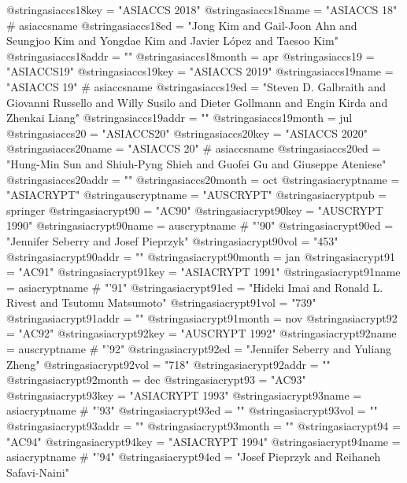 @string{asiaccs18key =          "ASIACCS 2018"}
@string{asiaccs18name =         "ASIACCS 18" # asiaccsname}
@string{asiaccs18ed =           "Jong Kim and Gail-Joon Ahn and Seungjoo Kim and Yongdae Kim and Javier L{\'o}pez and Taesoo Kim"}
@string{asiaccs18addr =         ""}
@string{asiaccs18month =        apr}
@string{asiaccs19 =             "ASIACCS19"}
@string{asiaccs19key =          "ASIACCS 2019"}
@string{asiaccs19name =         "ASIACCS 19" # asiaccsname}
@string{asiaccs19ed =           "Steven D. Galbraith and Giovanni Russello and Willy Susilo and Dieter Gollmann and Engin Kirda and Zhenkai Liang"}
@string{asiaccs19addr =         ""}
@string{asiaccs19month =        jul}
@string{asiaccs20 =             "ASIACCS20"}
@string{asiaccs20key =          "ASIACCS 2020"}
@string{asiaccs20name =         "ASIACCS 20" # asiaccsname}
@string{asiaccs20ed =           "Hung-Min Sun and Shiuh-Pyng Shieh and Guofei Gu and Giuseppe Ateniese"}
@string{asiaccs20addr =         ""}
@string{asiaccs20month =        oct}
@string{asiacryptname =         "ASIACRYPT"}
@string{auscryptname =          "AUSCRYPT"}
@string{asiacryptpub =          springer}
@string{asiacrypt90 =           "AC90"}
@string{asiacrypt90key =        "AUSCRYPT 1990"}
@string{asiacrypt90name =       auscryptname # "'90"}
@string{asiacrypt90ed =         "Jennifer Seberry and Josef Pieprzyk"}
@string{asiacrypt90vol =        "453"}
@string{asiacrypt90addr =       ""}
@string{asiacrypt90month =      jan}
@string{asiacrypt91 =           "AC91"}
@string{asiacrypt91key =        "ASIACRYPT 1991"}
@string{asiacrypt91name =       asiacryptname # "'91"}
@string{asiacrypt91ed =         "Hideki Imai and Ronald L. Rivest and Tsutomu Matsumoto"}
@string{asiacrypt91vol =        "739"}
@string{asiacrypt91addr =       ""}
@string{asiacrypt91month =      nov}
@string{asiacrypt92 =           "AC92"}
@string{asiacrypt92key =        "AUSCRYPT 1992"}
@string{asiacrypt92name =       auscryptname # "'92"}
@string{asiacrypt92ed =         "Jennifer Seberry and Yuliang Zheng"}
@string{asiacrypt92vol =        "718"}
@string{asiacrypt92addr =       ""}
@string{asiacrypt92month =      dec}
@string{asiacrypt93 =           "AC93"}
@string{asiacrypt93key =        "ASIACRYPT 1993"}
@string{asiacrypt93name =       asiacryptname # "'93"}
@string{asiacrypt93ed =         ""}
@string{asiacrypt93vol =        ""}
@string{asiacrypt93addr =       ""}
@string{asiacrypt93month =      ""}
@string{asiacrypt94 =           "AC94"}
@string{asiacrypt94key =        "ASIACRYPT 1994"}
@string{asiacrypt94name =       asiacryptname # "'94"}
@string{asiacrypt94ed =         "Josef Pieprzyk and Reihaneh Safavi-Naini"}
